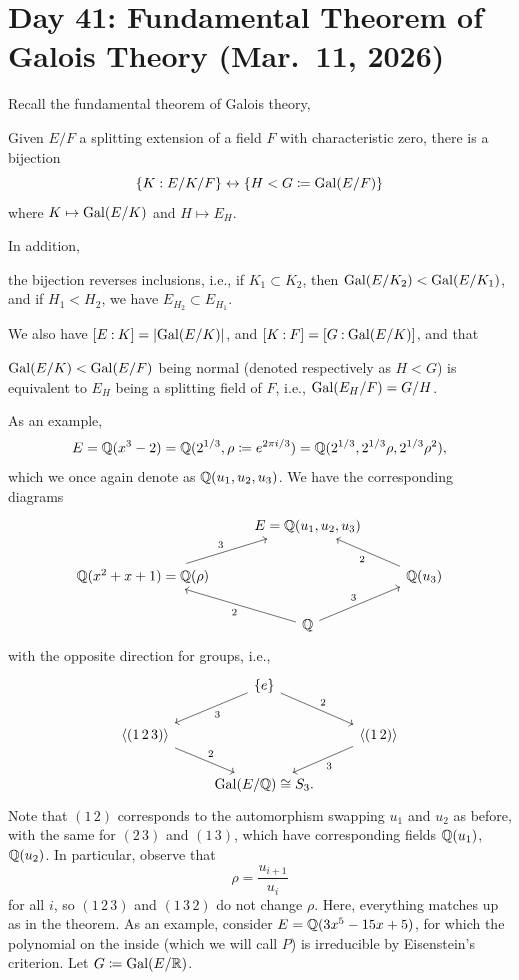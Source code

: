 \section{Day 41: Fundamental Theorem of Galois Theory (Mar.\ 11, 2026)}
Recall the fundamental theorem of Galois theory,
\begin{theorem}
    Given $E/F$ a splitting extension of a field $F$ with characteristic zero, there is a bijection
    \[ \{K : E/K/F\} \leftrightarrow \{H < G \coloneq \operatorname{Gal}(E/F)\} \]
    where $K \mapsto \operatorname{Gal}(E/K)$ and $H \mapsto E_H$.
\end{theorem}
In addition, \begin{parlist} \item the bijection reverses inclusions, i.e., if $K_1 \subset K_2$, then $\operatorname{Gal}(E/K_2) < \operatorname{Gal}(E/K_1)$, and if $H_1 < H_2$, we have $E_{H_2} \subset E_{H_1}$. \item We also have $\coor{E:K} = \abs{\Gal(E/K)}$, and $\coor{K:F} = \coor{G:\Gal(E/K)}$, and that \item $\operatorname{Gal}(E/K) < \operatorname{Gal}(E/F)$ being normal (denoted respectively as $H < G$) is equivalent to $E_H$ being a splitting field of $F$, i.e., $\operatorname{Gal}(E_H/F) = G/H$. \end{parlist} As an example,
\[ E = \mathbb Q(x^3 - 2) = \mathbb Q(2^{1/3}, \rho \coloneq e^{2\pi i /3}) = \mathbb Q(2^{1/3}, 2^{1/3} \rho, 2^{1/3} \rho^2), \]
which we once again denote as $\mathbb Q(u_1, u_2, u_3)$. We have the corresponding diagrams
\[ \begin{tikzcd}
    & E = \QQ(u_1, u_2, u_3) & \\
    \QQ(x^2 + x + 1) = \QQ(\rho) \arrow[ur, "3"] & & \QQ(u_3) \arrow[ul, "2"] \\ & \QQ \arrow[ul, "2"] \arrow[ur, "3"]
\end{tikzcd} \]
with the opposite direction for groups, i.e.,
\[ \begin{tikzcd}
    & \{e\} \arrow[dl, "3"] \arrow[dr, "2"] & \\
    \left<(1 \, 2 \, 3)\right> \arrow[dr, "2"] & & \left<(1 \, 2)\right> \arrow[dl, "3"] \\
    & \Gal(E/\QQ) \cong S_3.
\end{tikzcd} \]
Note that $(1 \, 2)$ corresponds to the automorphism swapping $u_1$ and $u_2$ as before, with the same for $(2 \, 3)$ and $(1 \, 3)$, which have corresponding fields $\mathbb Q(u_1)$, $\mathbb Q(u_2)$. In particular, observe that
\[ \rho = \frac{u_{i+1}}{u_i} \]
for all $i$, so $(1 \, 2 \, 3)$ and $(1 \, 3 \, 2)$ do not change $\rho$. Here, everything matches up as in the theorem. As an example, consider $E = \mathbb Q(3x^5 - 15x + 5)$, for which the polynomial on the inside (which we will call $P$) is irreducible by Eisenstein's criterion. Let $G \coloneq \operatorname{Gal}(E/\mathbb R)$.
